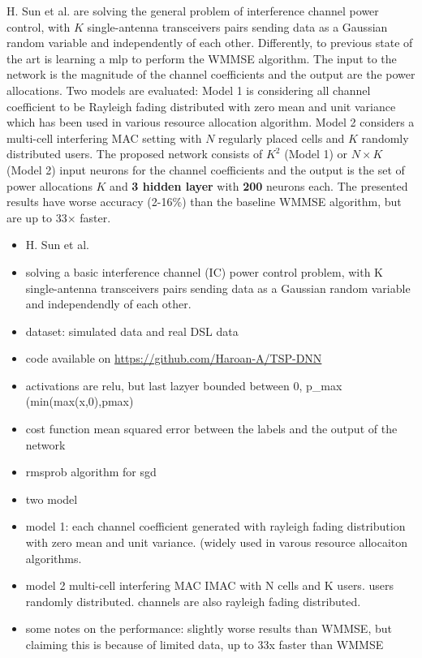H. Sun et al. are solving the general problem of interference channel power control, with $K$ single-antenna transceivers pairs sending data as a Gaussian random variable and independently of each other. Differently, to previous state of the art is learning a \gls{mlp} to perform the WMMSE algorithm. The input to the network is the magnitude of the channel coefficients and the output are the power allocations.
Two models are evaluated: Model 1 is considering all channel coefficient to be Rayleigh fading distributed with zero mean and unit variance which has been used in various resource allocation algorithm. Model 2 considers a multi-cell interfering MAC setting with $N$ regularly placed cells and $K$ randomly distributed users. The proposed network consists of $K^2$ (Model 1) or $N\times K$ (Model 2) input neurons for the channel coefficients and the output is the set of power allocations $K$ and \textbf{3 hidden layer} with \textbf{200} neurons each. The presented results have worse accuracy (2-16\%) than the baseline WMMSE algorithm, but are up to 33$\times$ faster.
\ifdefined\SHOWNOTES
\begin{itemize}
    \item H. Sun et al.
    \item solving a basic interference channel (IC) power control problem, with K single-antenna transceivers pairs sending data as a Gaussian random variable and independendly of each other.
    \item dataset: simulated data and real DSL data
    \item code available on \url{https://github.com/Haroan-A/TSP-DNN}
    \item activations are relu, but last lazyer bounded between 0, p\_max (min(max(x,0),pmax)
    \item cost function mean squared error between the labels and the output of the network
    \item rmsprob algorithm for sgd
    \item two model \follows
    \item model 1: each channel coefficient generated with rayleigh fading distribution with zero mean and unit variance. (widely used in varous resource allocaiton algorithms.
    \item model 2 multi-cell interfering MAC IMAC with N cells and K users. users randomly distributed. channels are also rayleigh fading distributed.
    \item some notes on the performance: slightly worse results than WMMSE, but claiming this is because of limited data, up to 33x faster than WMMSE
\end{itemize}
\fi
